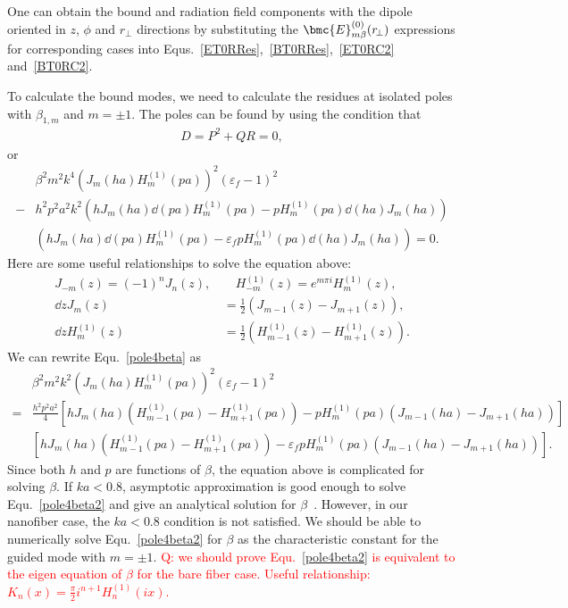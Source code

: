 \documentclass[]{report}
\begin{document}
One can obtain the bound and radiation field components with the dipole oriented in $ z $, $ \phi $ and $ r\!_\perp $ directions by substituting the $ \bmc{E}^{(0)}_{m\beta}(r\!_\perp) $ expressions for corresponding cases into Equs.~\ref{ET0RRes},~\ref{BT0RRes},~\ref{ET0RC2} and~\ref{BT0RC2}. 

To calculate the bound modes, we need to calculate the residues at isolated poles with $ \beta_{1,m} $ and $ m=\pm 1 $. The poles can be found by using the condition that
\begin{align}
D=P^2+QR=0,
\end{align}
or
\begin{align}\label{pole4beta}
&\beta^2m^2k^4\left(J_m(ha) H_m^{(1)}(pa) \right)^2 (\varepsilon_f-1)^2\nonumber\\
-& h^2p^2a^2k^2 \left(hJ_m(ha) \dd{}{(pa)}H_m^{(1)}(pa)-pH_m^{(1)}(pa)\dd{}{(ha)}J_m(ha) \right)\nonumber\\ &\left(hJ_m(ha) \dd{}{(pa)}H_m^{(1)}(pa)-\varepsilon_f pH_m^{(1)}(pa)\dd{}{(ha)}J_m(ha) \right)=0.
\end{align}
Here are some useful relationships to solve the equation above:
\begin{align}
J_{-m}(z)=(-1)^nJ_n(z),\, &\quad H_{-m}^{(1)}(z)=e^{m\pi i}H_m^{(1)}(z),\\
\dd{}{z}J_m(z) &= \frac{1}{2} \left( J_{m-1}(z)-J_{m+1}(z) \right),\\ 
\dd{}{z}H^{(1)}_m(z) &= \frac{1}{2} \left( H^{(1)}_{m-1}(z)-H^{(1)}_{m+1}(z) \right).
\end{align}
We can rewrite Equ.~\ref{pole4beta} as
\begin{align}\label{pole4beta2}
&\beta^2m^2k^2\left(J_m\!(ha) H_m^{(\!1\!)}\!(pa) \right)^2 (\varepsilon_f-1)^2\nonumber\\
=& \frac{h^2p^2a^2}{4} \left[hJ_m\!(ha)\! \left( H^{(\!1\!)}_{m-1}\!(pa)\!-\! H^{(\!1\!)}_{m+1}\!(pa) \right)\!-\! pH_m^{(\!1\!)}\!(pa)\left( J_{m-1}\!(ha)\!-\! J_{m+1}\!(ha) \right) \right]\nonumber\\ 
&\left[hJ_m\!(ha) \left( H^{(\!1\!)}_{m-1}\!(pa)\!-\! H^{(\!1\!)}_{m+1}\!(pa) \right)\!-\! \varepsilon_f pH_m^{(\!1\!)}\!(pa)\left( J_{m-1}\!(ha)\!-\! J_{m+1}\!(ha) \right) \right].
\end{align}
Since both $ h $ and $ p $ are functions of $ \beta $, the equation above is complicated for solving $ \beta $. If $ ka<0.8 $, asymptotic approximation is good enough to solve Equ.~\ref{pole4beta2} and give an analytical solution for $ \beta $~\cite{Klimov2004}. However, in our nanofiber case, the $ ka<0.8 $ condition is not satisfied. We should be able to numerically solve Equ.~\ref{pole4beta2} for $ \beta $ as the characteristic constant for the guided mode with $ m=\pm 1 $. \textcolor{red}{Q: we should prove Equ.~\eqref{pole4beta2} is equivalent to the eigen equation of $ \beta $ for the bare fiber case. Useful relationship: $ K_n(x)=\frac{\pi}{2}i^{n+1}H_n^{(1)}(ix) $.}
\end{document}
